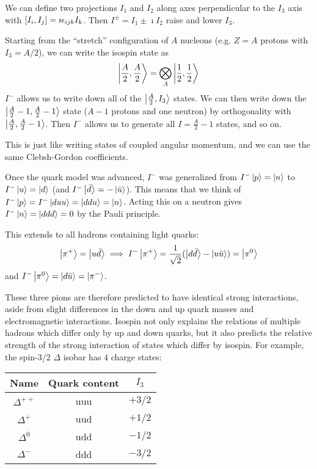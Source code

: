 \documentclass[a4paper,twoside,master.tex]{subfiles}
\begin{document}

We can define two projections $ I_1 $ and $ I_2 $ along axes perpendicular to the $ I_3 $ axis with $ \comm{I_i}{I_j} = \imath \epsilon_{ijk} I_k $. Then $ I^{\pm} = I_1 \pm \imath I_2 $ raise and lower $ I_3 $.

Starting from the ``stretch'' configuration of $ A $ nucleons (e.g. $ Z = A $ protons with $ I_3 = A/2 $), we can write the isospin state as
\begin{equation}
    \ket{\frac{A}{2}, \frac{A}{2}} = \bigotimes_A\ket{\frac{1}{2}, \frac{1}{2}}
\end{equation}
$ I^- $ allows us to write down all of the $\ket{\frac{A}{2}, I_3} $ states. We can then write down the $\ket{\frac{A}{2} - 1, \frac{A}{2} - 1} $ state ($ A - 1 $ protons and one neutron) by orthogonality with $\ket{\frac{A}{2}, \frac{A}{2} - 1} $. Then $ I^- $ allows us to generate all $ I = \frac{A}{2} - 1 $ states, and so on.

This is just like writing states of coupled angular momentum, and we can use the same Clebsh-Gordon coefficients.

Once the quark model was advanced, $ I^- $ was generalized from $ I^-\ket{p} =\ket{n} $ to $ I^-\ket{u} =\ket{d} $ (and $ I^-\ket{\bar{d}} = -\ket{\bar{u}} $). This means that we think of $ I^-\ket{p} = I^-\ket{duu} =\ket{ddu} =\ket{n} $. Acting this on a neutron gives $ I^-\ket{n} =\ket{ddd} = 0 $ by the Pauli principle.

This extends to all hadrons containing light quarks:
\begin{equation}
    \ket{\pi^+} =\ket{u \bar{d}} \implies I^-\ket{\pi^+} = \frac{1}{\sqrt{2}} (\ket{d \bar{d}} - \ket{u \bar{u}}) =\ket{\pi^0}
\end{equation}
and $ I^-\ket{\pi^0} =\ket{d \bar{u}} =\ket{\pi^-} $.

These three pions are therefore predicted to have identical strong interactions, aside from slight differences in the down and up quark masses and electromagnetic interactions. Isospin not only explains the relations of multiple hadrons which differ only by up and down quarks, but it also predicts the relative strength of the strong interaction of states which differ by isospin. For example, the spin-3/2 $ \Delta $ isobar has $ 4 $ charge states:
\begin{center}
    \begin{tabular}{@{}ccc@{}}
        Name & Quark content & $ I_3 $ \\
        \toprule
        $ \Delta^{++} $ & uuu & $ +3/2 $ \\
        $ \Delta^{+} $ & uud & $ +1/2 $ \\
        $ \Delta^{0} $ & udd & $ -1/2 $ \\
        $ \Delta^{-} $ & ddd & $ -3/2 $ \\
        \bottomrule
    \end{tabular}
\end{center}
\end{document}
